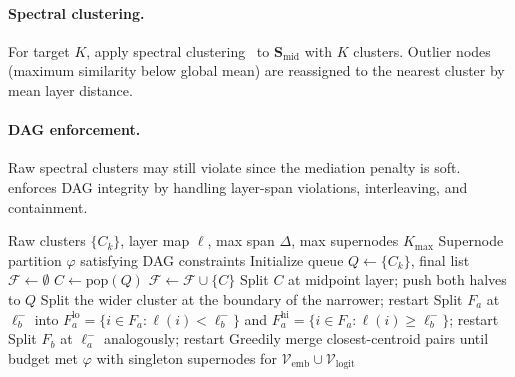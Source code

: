 \documentclass[11pt]{article}
\newcommand{\cV}{\mathcal{V}}
\newcommand{\bS}{\mathbf{S}}
\newcommand{\1}{\mathbbm{1}}
\begin{document}
\paragraph{Spectral clustering.}
For target $K$, apply spectral clustering~\citep{ng2002spectral} to $\bS_{\mathrm{mid}}$ with $K$ clusters.
Outlier nodes (maximum similarity below global mean) are reassigned to the nearest cluster by mean layer distance.

\paragraph{DAG enforcement.}
Raw spectral clusters may still violate  since the mediation penalty is soft.
 enforces DAG integrity by handling layer-span violations, interleaving, and containment.

\begin{algorithm}[t]
\caption{DAG Enforcement}
\label{alg:dag}
\begin{algorithmic}[1]
\Require Raw clusters $\{C_k\}$, layer map $\ell$, max span $\Delta$, max supernodes $K_{\max}$
\Ensure Supernode partition $\varphi$ satisfying DAG constraints
\State Initialize queue $Q \leftarrow \{C_k\}$, final list $\mathcal{F} \leftarrow \emptyset$
 
  \State $C \leftarrow \mathrm{pop}(Q)$
    \State $\mathcal{F} \leftarrow \mathcal{F} \cup \{C\}$
  \Else
    \State Split $C$ at midpoint layer; push both halves to $Q$
  \EndIf
\EndWhile
\Repeat {}
     
      \State Split the wider cluster at the boundary of the narrower; restart
     
      \State Split $F_a$ at $\ell^-_b$ into $F_a^{\mathrm{lo}} = \{i \in F_a : \ell(i) < \ell^-_b\}$ and $F_a^{\mathrm{hi}} = \{i \in F_a : \ell(i) \ge \ell^-_b\}$; restart
     
      \State Split $F_b$ at $\ell^-_a$ analogously; restart
    \EndIf
  \EndFor
{}
  \State Greedily merge closest-centroid pairs until budget met
\EndIf
\State \Return $\varphi$ with singleton supernodes for $\cV_{\mathrm{emb}} \cup \cV_{\mathrm{logit}}$
\end{algorithmic}
\end{algorithm}
\end{document}
